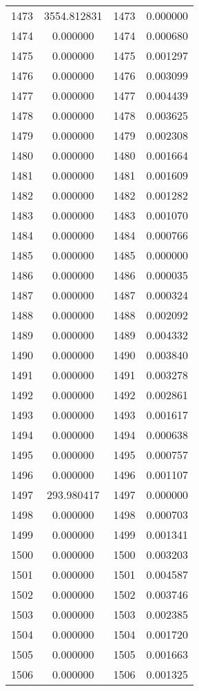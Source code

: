 \documentclass[12pt]{article}
\begin{document}
\begin{longtable}{@{}cccc@{}}
1473 & 3554.812831 & 1473 & 0.000000 \\
1474 & 0.000000 & 1474 & 0.000680 \\
1475 & 0.000000 & 1475 & 0.001297 \\
1476 & 0.000000 & 1476 & 0.003099 \\
1477 & 0.000000 & 1477 & 0.004439 \\
1478 & 0.000000 & 1478 & 0.003625 \\
1479 & 0.000000 & 1479 & 0.002308 \\
1480 & 0.000000 & 1480 & 0.001664 \\
1481 & 0.000000 & 1481 & 0.001609 \\
1482 & 0.000000 & 1482 & 0.001282 \\
1483 & 0.000000 & 1483 & 0.001070 \\
1484 & 0.000000 & 1484 & 0.000766 \\
1485 & 0.000000 & 1485 & 0.000000 \\
1486 & 0.000000 & 1486 & 0.000035 \\
1487 & 0.000000 & 1487 & 0.000324 \\
1488 & 0.000000 & 1488 & 0.002092 \\
1489 & 0.000000 & 1489 & 0.004332 \\
1490 & 0.000000 & 1490 & 0.003840 \\
1491 & 0.000000 & 1491 & 0.003278 \\
1492 & 0.000000 & 1492 & 0.002861 \\
1493 & 0.000000 & 1493 & 0.001617 \\
1494 & 0.000000 & 1494 & 0.000638 \\
1495 & 0.000000 & 1495 & 0.000757 \\
1496 & 0.000000 & 1496 & 0.001107 \\
1497 & 293.980417 & 1497 & 0.000000 \\
1498 & 0.000000 & 1498 & 0.000703 \\
1499 & 0.000000 & 1499 & 0.001341 \\
1500 & 0.000000 & 1500 & 0.003203 \\
1501 & 0.000000 & 1501 & 0.004587 \\
1502 & 0.000000 & 1502 & 0.003746 \\
1503 & 0.000000 & 1503 & 0.002385 \\
1504 & 0.000000 & 1504 & 0.001720 \\
1505 & 0.000000 & 1505 & 0.001663 \\
1506 & 0.000000 & 1506 & 0.001325 \\

\end{longtable}
\end{document}

